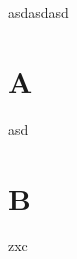 \documentclass[a4paper,12pt]{book}
\begin{document}

asdasdasd
\cleardoublepage

\frontmatter
\tableofcontents
\mainmatter
\chapter{A}
asd
\chapter{B}
zxc
\end{document}
